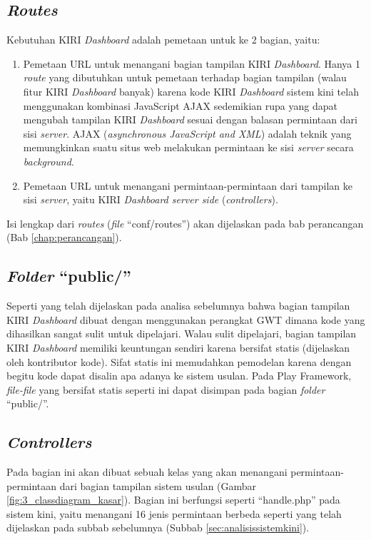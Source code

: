 \subsection{\textit{Routes}}
\label{sec:routesusulan}
Kebutuhan KIRI \textit{Dashboard} adalah pemetaan untuk ke 2 bagian, yaitu:
\begin{enumerate}
	\item Pemetaan URL untuk menangani bagian tampilan KIRI \textit{Dashboard}. Hanya 1 \textit{route} yang dibutuhkan untuk pemetaan terhadap bagian tampilan (walau fitur KIRI \textit{Dashboard} banyak) karena kode KIRI \textit{Dashboard} sistem kini telah menggunakan kombinasi JavaScript AJAX sedemikian rupa yang dapat mengubah tampilan KIRI \textit{Dashboard} sesuai dengan balasan permintaan dari sisi \textit{server}. AJAX (\textit{asynchronous JavaScript and XML}) adalah teknik yang memungkinkan suatu situs web melakukan permintaan ke sisi \textit{server} secara \textit{background}\cite{w3schools}.
	\item Pemetaan URL untuk menangani permintaan-permintaan dari tampilan ke sisi \textit{server}, yaitu KIRI \textit{Dashboard server side} (\textit{controllers}).
\end{enumerate}

Isi lengkap dari \textit{routes} (\textit{file} ``conf/routes'') akan dijelaskan pada bab perancangan (Bab \ref{chap:perancangan}).

\subsection{\textit{Folder} ``public/''}
\label{sec:folderpublic}
Seperti yang telah dijelaskan pada analisa sebelumnya bahwa bagian tampilan KIRI \textit{Dashboard} dibuat dengan menggunakan perangkat GWT dimana kode yang dihasilkan sangat sulit untuk dipelajari. Walau sulit dipelajari, bagian tampilan KIRI \textit{Dashboard} memiliki keuntungan sendiri karena bersifat statis (dijelaskan oleh kontributor kode). Sifat statis ini memudahkan pemodelan karena dengan begitu kode dapat disalin apa adanya ke sistem usulan. Pada Play Framework, \textit{file-file} yang bersifat statis seperti ini dapat disimpan pada bagian \textit{folder} ``public/''.

\subsection{\textit{Controllers}}
\label{sec:controllerusulan}
Pada bagian ini akan dibuat sebuah kelas yang akan menangani permintaan-permintaan dari bagian tampilan sistem usulan (Gambar \ref{fig:3_classdiagram_kasar}). Bagian ini berfungsi seperti ``handle.php'' pada sistem kini, yaitu menangani 16 jenis permintaan berbeda seperti yang telah dijelaskan pada subbab sebelumnya (Subbab \ref{sec:analisissistemkini}).

